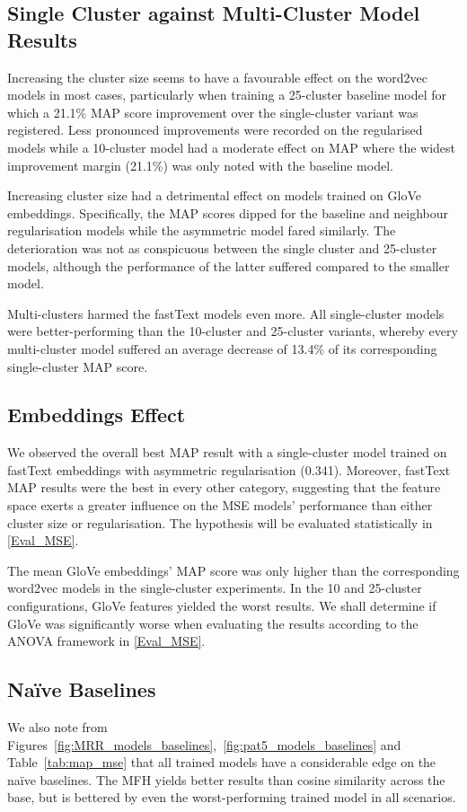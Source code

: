 \subsection{Single Cluster against Multi-Cluster Model Results}
Increasing the cluster size seems to have a favourable effect on the word2vec models in most cases, particularly when training a 25-cluster baseline model for which a 21.1\% \ac{MAP} score improvement over the single-cluster variant was registered.  Less pronounced improvements were recorded on the regularised models while a 10-cluster model had a moderate effect on \ac{MAP} where the widest improvement margin (21.1\%) was only noted with the baseline model.  

Increasing cluster size had a detrimental effect on models trained on GloVe embeddings.  Specifically, the \ac{MAP} scores dipped for the baseline and neighbour regularisation models while the asymmetric model fared similarly.  The deterioration was not as conspicuous between the single cluster and 25-cluster models, although the performance of the latter suffered compared to the smaller model.  

Multi-clusters harmed the fastText models even more.  All single-cluster models were better-performing than the 10-cluster and 25-cluster variants, whereby every multi-cluster model suffered an average decrease of 13.4\% of its corresponding single-cluster \ac{MAP} score.  

\subsection{Embeddings Effect} \label{ustalov_embeddings}
We observed the overall best \ac{MAP} result with a single-cluster model trained on fastText embeddings with asymmetric regularisation (0.341).  Moreover, fastText \ac{MAP} results were the best in every other category, suggesting that the feature space exerts a greater influence on the \ac{MSE} models' performance than either cluster size or regularisation.  The hypothesis will be evaluated statistically in \cref{Eval_MSE}.

The mean GloVe embeddings' \ac{MAP} score was only higher than the corresponding word2vec models in the single-cluster experiments.  In the 10 and 25-cluster configurations, GloVe features yielded the worst results.  We shall determine if GloVe was significantly worse when evaluating the results according to the \ac{ANOVA} framework in \cref{Eval_MSE}.

\subsection{Na\"ive Baselines}
We also note from Figures~\ref{fig:MRR_models_baselines},~\ref{fig:pat5_models_baselines} and Table~\ref{tab:map_mse} that all trained models have a considerable edge on the na\"ive baselines.  The \ac{MFH} yields better results than cosine similarity across the base, but is bettered by even the worst-performing trained model in all scenarios.  

